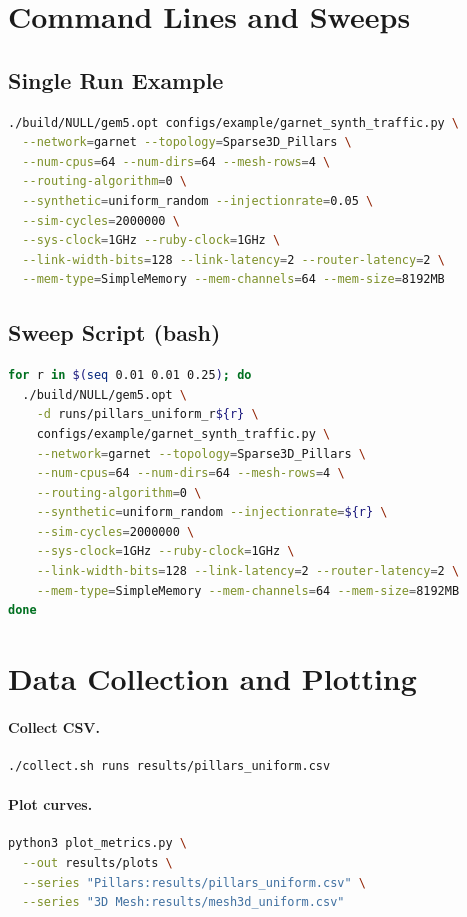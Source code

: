 \documentclass[11pt]{article}
\begin{document}
\section{Command Lines and Sweeps}
\subsection*{Single Run Example}
\begin{lstlisting}[language=bash]
./build/NULL/gem5.opt configs/example/garnet_synth_traffic.py \
  --network=garnet --topology=Sparse3D_Pillars \
  --num-cpus=64 --num-dirs=64 --mesh-rows=4 \
  --routing-algorithm=0 \
  --synthetic=uniform_random --injectionrate=0.05 \
  --sim-cycles=2000000 \
  --sys-clock=1GHz --ruby-clock=1GHz \
  --link-width-bits=128 --link-latency=2 --router-latency=2 \
  --mem-type=SimpleMemory --mem-channels=64 --mem-size=8192MB
\end{lstlisting}

\subsection*{Sweep Script (bash)}
\begin{lstlisting}[language=bash]
for r in $(seq 0.01 0.01 0.25); do
  ./build/NULL/gem5.opt \
    -d runs/pillars_uniform_r${r} \
    configs/example/garnet_synth_traffic.py \
    --network=garnet --topology=Sparse3D_Pillars \
    --num-cpus=64 --num-dirs=64 --mesh-rows=4 \
    --routing-algorithm=0 \
    --synthetic=uniform_random --injectionrate=${r} \
    --sim-cycles=2000000 \
    --sys-clock=1GHz --ruby-clock=1GHz \
    --link-width-bits=128 --link-latency=2 --router-latency=2 \
    --mem-type=SimpleMemory --mem-channels=64 --mem-size=8192MB
done
\end{lstlisting}

\section{Data Collection and Plotting}
\label{sec:repro}
\paragraph{Collect CSV.}
\begin{lstlisting}[language=bash]
./collect.sh runs results/pillars_uniform.csv
\end{lstlisting}

\paragraph{Plot curves.}
\begin{lstlisting}[language=bash]
python3 plot_metrics.py \
  --out results/plots \
  --series "Pillars:results/pillars_uniform.csv" \
  --series "3D Mesh:results/mesh3d_uniform.csv"
\end{lstlisting}
\end{document}
